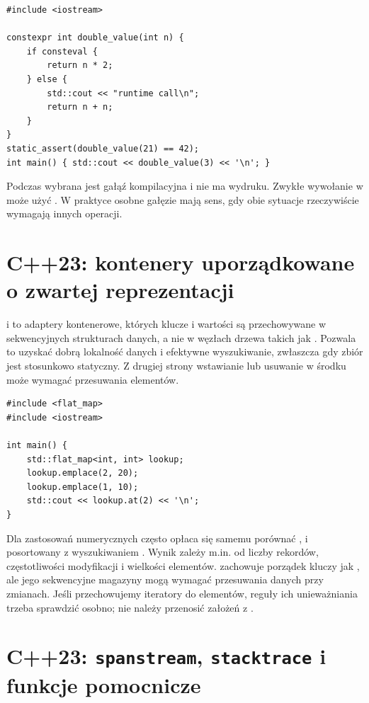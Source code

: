 \begin{lstlisting}[caption={if consteval (C++23, kompletny program).}]
#include <iostream>

constexpr int double_value(int n) {
    if consteval {
        return n * 2;
    } else {
        std::cout << "runtime call\n";
        return n + n;
    }
}
static_assert(double_value(21) == 42);
int main() { std::cout << double_value(3) << '\n'; }
\end{lstlisting}

Podczas  wybrana jest gałąź kompilacyjna i
nie ma wydruku. Zwykłe wywołanie w  może użyć .
W praktyce osobne gałęzie mają sens, gdy obie sytuacje rzeczywiście
wymagają innych operacji.

\section{C++23: kontenery uporządkowane o zwartej reprezentacji}

 i  to adaptery kontenerowe,
których klucze i wartości są przechowywane w sekwencyjnych
strukturach danych, a nie w węzłach drzewa takich jak .
Pozwala to uzyskać dobrą lokalność danych i efektywne wyszukiwanie,
zwłaszcza gdy zbiór jest stosunkowo statyczny. Z drugiej strony
wstawianie lub usuwanie w środku może wymagać przesuwania elementów.

\begin{lstlisting}[caption={Mapa o sekwencyjnym przechowywaniu (C++23).}]
#include <flat_map>
#include <iostream>

int main() {
    std::flat_map<int, int> lookup;
    lookup.emplace(2, 20);
    lookup.emplace(1, 10);
    std::cout << lookup.at(2) << '\n';
}
\end{lstlisting}

Dla zastosowań numerycznych często opłaca się samemu porównać
,  i posortowany 
z wyszukiwaniem . Wynik zależy m.in. od liczby
rekordów, częstotliwości modyfikacji i wielkości elementów.
 zachowuje porządek kluczy jak , ale jego
sekwencyjne magazyny mogą wymagać przesuwania danych przy zmianach.
Jeśli przechowujemy iteratory do elementów, reguły ich unieważniania
trzeba sprawdzić osobno; nie należy przenosić założeń z .

\section{C++23: \texttt{spanstream}, \texttt{stacktrace} i funkcje pomocnicze}

